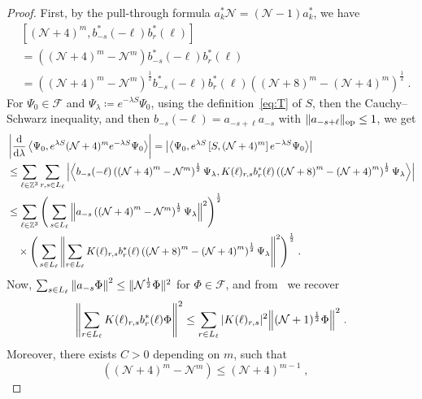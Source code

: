 \documentclass[12pt,a4paper]{article}
\numberwithin{equation}{section}
\newcommand{\cF}{\mathcal{F}}
\newcommand{\cN}{\mathcal{N}}
\newcommand{\1}{\mathbb{I}}
\newcommand{\di}{\textnormal{d}}
\newcommand{\Ncal}{\mathcal{N}}
\newcommand{\Zstar}{\mathbb{Z}^3} %
\newcommand{\Z}{\mathbb{Z}}
\newcommand{\NN}{\mathcal{N}}
\newcommand{\half}{\frac{1}{2}}
\newcommand{\eva}[1]{\left\langle #1 \right\rangle}
\theoremstyle{plain}
\theoremstyle{definition}
\theoremstyle{remark}
\theoremstyle{plain}
\theoremstyle{definition}
\theoremstyle{remark}
\begin{document}
\begin{proof}
First, by the pull-through formula $a^*_k \Ncal = (\Ncal - 1) a^*_k$, we have
\begin{align}
	& \left[(\NN+4)^m, b^*_{-s}(-\ell)b^*_{r}(\ell)\right] \nonumber\\
	&= \left( (\NN+4)^m - \NN^m \right) b^*_{-s}(-\ell)b^*_{r}(\ell) \nonumber\\
	&= \left( \left(\NN+4\right)^m - \NN^m \right)^\half b^*_{-s}(-\ell)b^*_{r}(\ell) \left( \left(\NN+8\right)^m - \left(\NN+4\right)^m \right)^\half \;.
\end{align}
For $ \Psi_0 \in \cF $ and $ \Psi_\lambda \coloneq e^{-\lambda S} \Psi_0 $, using the definition~\eqref{eq:T} of $ S $, then the Cauchy--Schwarz inequality, and then $ b_{-s}(-\ell) = a_{-s+\ell} a_{-s} $ with $ \Vert a_{-s+\ell} \Vert_{\textnormal{op}} \le 1 $, we get
\begin{align*}
	&\left|\frac{\di}{\di\lambda}\eva{\Psi_0, e^{\lambda S} (\mathcal{N}+4)^m e^{-\lambda S} \Psi_0 }\right|
	= \left| \eva{\Psi_0, e^{\lambda S} \left[S, (\NN+4)^m\right] e^{-\lambda S} \Psi_0}\right|\nonumber\\
	&\leq \sum_{\ell\in \Zstar}
		\sum_{r,s\in L_\ell} \abs{\eva{ b_{-s}(-\ell) \left( \left(\NN+4\right)^m - \NN^m \right)^\half \Psi_\lambda, K(\ell)_{r,s} b^*_{r}(\ell) \left( \left(\NN+8\right)^m - \left(\NN+4\right)^m \right)^\half \Psi_\lambda }}\nonumber\\
	&\leq \sum_{\ell\in \Zstar}
		\Bigg( \sum_{s\in L_\ell} \norm{ a_{-s} \left( \left(\NN+4\right)^m - \NN^m \right)^\half \Psi_\lambda}^2 \Bigg)^{\half} \nonumber\\
		&\quad \times \Bigg( \sum_{s\in L_\ell}
			\norm { \sum_{r\in L_\ell} K(\ell)_{r,s} b^*_{r}(\ell) \left( \left(\NN+8\right)^m - \left(\NN+4\right)^m \right)^\half \Psi_\lambda}^2 \Bigg)^{\half} \;. \nonumber\\
\end{align*}
Now, $ \sum_{s \in L_\ell} \norm{a_{-s} \Phi}^2 \leq \Vert \cN^{\half} \Phi \Vert^2 $ for $ \Phi \in \cF $, and from~\cite[Prop.~4.2]{CHN21} we recover
\begin{equation}
	\norm{\sum_{r\in L_\ell} K(\ell)_{r,s} b^*_{r}(\ell) \Phi}^2
	\le \sum_{r\in L_\ell} |K(\ell)_{r,s}|^2
		\norm{(\cN + 1)^{\half} \Phi}^2 \;.
\end{equation}
Moreover, there exists $ C > 0 $ depending on $ m $, such that
\begin{equation}
	\left( \left(\NN+4\right)^m - \NN^m \right)
	\leq \left(\NN+4\right)^{m-1} \;, \quad

\end{equation}
\end{proof}
\end{document}
